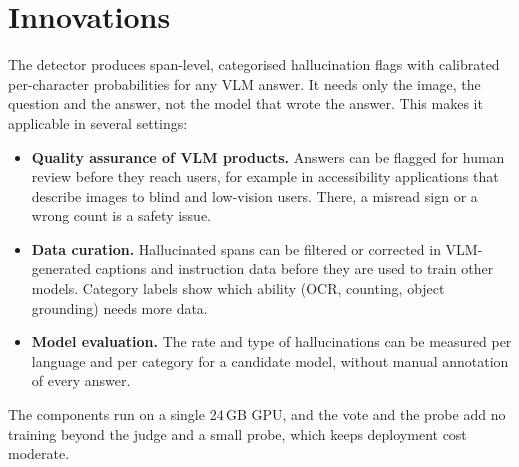 \chapter*{Innovations}

The detector produces span-level, categorised hallucination flags with calibrated per-character probabilities for any VLM answer. It needs only the image, the question and the answer, not the model that wrote the answer. This makes it applicable in several settings:
\begin{itemize}
    \item \textbf{Quality assurance of VLM products.} Answers can be flagged for human review before they reach users, for example in accessibility applications that describe images to blind and low-vision users. There, a misread sign or a wrong count is a safety issue.
    \item \textbf{Data curation.} Hallucinated spans can be filtered or corrected in VLM-generated captions and instruction data before they are used to train other models. Category labels show which ability (OCR, counting, object grounding) needs more data.
    \item \textbf{Model evaluation.} The rate and type of hallucinations can be measured per language and per category for a candidate model, without manual annotation of every answer.
\end{itemize}
The components run on a single 24\,GB GPU, and the vote and the probe add no training beyond the judge and a small probe, which keeps deployment cost moderate.
